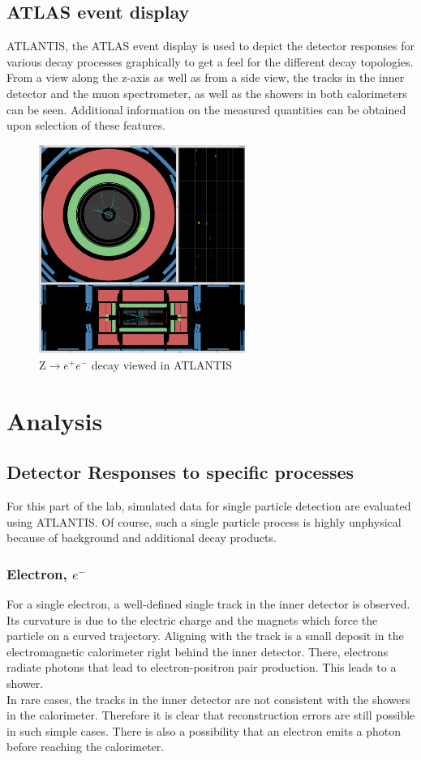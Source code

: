 \documentclass[twoside,        %
               BCOR12mm,       %
               ngerman,english, %
               fleqn,headsepline=false,footsepline=false
              ]{Vorlage/MFPREPORT}
\begin{document}
\subsection{ATLAS event display}
ATLANTIS, the ATLAS event display is used to depict the detector responses for
various decay processes graphically to get a feel for the different decay
topologies. From a view along the z-axis as well as from a side view, the tracks
in the inner detector and the muon spectrometer, as well as the showers in both
calorimeters can be seen. Additional information on the measured quantities can
be obtained upon selection of these features.
\begin{figure}[]
    \centering
        \includegraphics[width=0.6\textwidth]{fig/Zee}
    \caption{Z$\rightarrow e^+e^-$ decay viewed in ATLANTIS}
    \label{fig:atlantis}
\end{figure}




\section{Analysis}
\label{sec:analysis}
\subsection{Detector Responses to specific processes}
For this part of the lab, simulated data for single particle detection are
evaluated using ATLANTIS. Of course, such a single particle process is highly
unphysical because of background and additional decay products.
\subsubsection{Electron, $e^-$}
For a single electron, a well-defined single track in the inner detector is
observed. Its curvature is due to the electric charge and the magnets which
force the particle on a curved trajectory. Aligning with the track is a small
deposit in the electromagnetic calorimeter right behind the inner detector.
There, electrons radiate photons that lead to electron-positron pair
production. This leads to a shower.\\
In rare cases, the tracks in the inner detector are not consistent with the
showers in the calorimeter. Therefore it is clear that reconstruction errors
are still possible in such simple cases. There is also a possibility that an
electron emits a photon before reaching the calorimeter.
\end{document}
